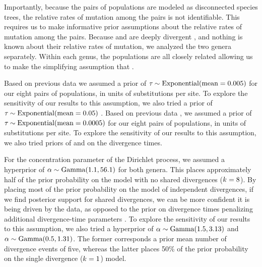 Importantly, because the pairs of populations are modeled as disconnected
species trees, the relative rates of mutation among the pairs is not
identifiable.
This requires us to make informative prior assumptions about the relative rates
of mutation among the pairs.
Because  and  are deeply divergent
\citep[$>$ 80 mya;][]{Gamble2011},
and nothing is known about their relative rates of mutation, we analyzed the
two genera separately.
Within each genus, the populations are all closely related \citep{Welton2010,
    Welton2010zootaxa, Siler2010, Siler2012, Siler2014kikuchii} allowing us to
make the simplifying assumption that .

Based on previous data \citep{Welton2010, Welton2010zootaxa, Siler2010} we
assumed a prior  of
$\tau_{} \sim \textrm{Exponential}(\textrm{mean} = 0.005)$
 for
our eight pairs of  populations, in units of substitutions
per site.
To explore the sensitivity of our results to this assumption, we also
tried a prior  of
$\tau_{} \sim \textrm{Exponential}(\textrm{mean} = 0.05)$
.
Based on previous data \citep{Siler2012, Siler2014kikuchii}, we assumed a
 prior of
$\tau_{} \sim \textrm{Exponential}(\textrm{mean} = 0.0005)$ 
for our eight pairs of 
populations, in units of substitutions per site.
To explore the sensitivity of our results to this assumption, we also tried
priors of  and  on the 
divergence times.

For the concentration parameter of the Dirichlet process, we assumed
a hyperprior of $\alpha \sim \textrm{Gamma}(1.1, 56.1)$ for both genera.
This places approximately half of the prior probability on the model
with no shared divergences ($k_{} = 8$).
By placing most of the prior probability on the model of independent
divergences, if we find posterior support for shared divergences, we can be
more confident it is being driven by the data,
as opposed to the prior on divergence times penalizing additional
divergence-time parameters
\citep{Jeffreys1939,Lindley1957,Oaks2012,Oaks2014reply}.
To explore the sensitivity of our results to this assumption, we also
tried a hyperprior of
$\alpha \sim \textrm{Gamma}(1.5, 3.13)$
and
$\alpha \sim \textrm{Gamma}(0.5, 1.31)$.
The former corresponds  a prior mean number of divergence events of five,
whereas the latter places 50\% of the prior probability on the single
divergence ($k_{} = 1$) model.

